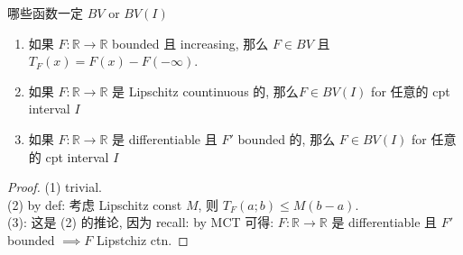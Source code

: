 \documentclass[lang=cn,11pt]{elegantbook}
\begin{document}
\begin{lemma}{哪些函数一定 $BV$ or $BV(I)$}
\begin{enumerate}
    \item 如果 $F:\mathbb{R}\to \mathbb{R}$  bounded 且 increasing, 那么  $F \in BV$ 且 $T_F(x) = F(x) - F(-\infty)$.\\
    \item 如果 $F: \mathbb{R} \to \mathbb{R}$  是 Lipschitz countinuous 的, 那么$F \in BV(I)$ for 任意的 cpt interval $I$
    \item 如果 $F: \mathbb{R} \to \mathbb{R}$  是 differentiable 且 $F'$ bounded 的, 那么 $F \in BV(I)$ for 任意的 cpt interval $I$
\end{enumerate}
\end{lemma}
\begin{proof}
(1) trivial.\\
(2) by def: 考虑 Lipschitz const $M$, 则 $T_F(a;b) \leq M (b-a)$.\\
(3): 这是 (2) 的推论, 因为 recall: by MCT 可得: $F: \mathbb{R} \to \mathbb{R}$  是 differentiable 且 $F'$ bounded $\implies F$ Lipstchiz ctn.
\end{proof}
\end{document}
